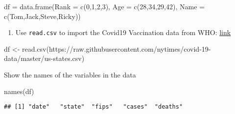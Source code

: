 \documentclass[
]{article}
\newenvironment{Shaded}{\begin{snugshade}}{\end{snugshade}}
\newcommand{\AttributeTok}[1]{\textcolor[rgb]{0.77,0.63,0.00}{#1}}
\newcommand{\FunctionTok}[1]{\textcolor[rgb]{0.00,0.00,0.00}{#1}}
\newcommand{\NormalTok}[1]{#1}
\newcommand{\OtherTok}[1]{\textcolor[rgb]{0.56,0.35,0.01}{#1}}
\newcommand{\StringTok}[1]{\textcolor[rgb]{0.31,0.60,0.02}{#1}}
\providecommand{\tightlist}{%
  \setlength{\itemsep}{0pt}\setlength{\parskip}{0pt}}
\begin{document}
\begin{Shaded}
\begin{Highlighting}[]
\NormalTok{df }\OtherTok{=} \FunctionTok{data.frame}\NormalTok{(}\AttributeTok{Rank =} \FunctionTok{c}\NormalTok{(}\StringTok{\textquotesingle{}0\textquotesingle{}}\NormalTok{,}\StringTok{\textquotesingle{}1\textquotesingle{}}\NormalTok{,}\StringTok{\textquotesingle{}2\textquotesingle{}}\NormalTok{,}\StringTok{\textquotesingle{}3\textquotesingle{}}\NormalTok{), }\AttributeTok{Age =} \FunctionTok{c}\NormalTok{(}\StringTok{\textquotesingle{}28\textquotesingle{}}\NormalTok{,}\StringTok{\textquotesingle{}34\textquotesingle{}}\NormalTok{,}\StringTok{\textquotesingle{}29\textquotesingle{}}\NormalTok{,}\StringTok{\textquotesingle{}42\textquotesingle{}}\NormalTok{), }\AttributeTok{Name =} \FunctionTok{c}\NormalTok{(}\StringTok{\textquotesingle{}Tom\textquotesingle{}}\NormalTok{,}\StringTok{\textquotesingle{}Jack\textquotesingle{}}\NormalTok{,}\StringTok{\textquotesingle{}Steve\textquotesingle{}}\NormalTok{,}\StringTok{\textquotesingle{}Ricky\textquotesingle{}}\NormalTok{))}
\end{Highlighting}
\end{Shaded}

\begin{enumerate}
\def\labelenumi{\arabic{enumi}.}
\setcounter{enumi}{1}
\tightlist
\item
  Use \texttt{read.csv} to import the Covid19 Vaccination data from WHO:
  \href{https://raw.githubusercontent.com/nytimes/covid-19-data/master/us-states.csv}{link}
\end{enumerate}

\begin{Shaded}
\begin{Highlighting}[]
\NormalTok{df }\OtherTok{\textless{}{-}} \FunctionTok{read.csv}\NormalTok{(}\StringTok{\textquotesingle{}https://raw.githubusercontent.com/nytimes/covid{-}19{-}data/master/us{-}states.csv\textquotesingle{}}\NormalTok{)}
\end{Highlighting}
\end{Shaded}

Show the names of the variables in the data

\begin{Shaded}
\begin{Highlighting}[]
\FunctionTok{names}\NormalTok{(df)}
\end{Highlighting}
\end{Shaded}

\begin{verbatim}
## [1] "date"   "state"  "fips"   "cases"  "deaths"
\end{verbatim}
\end{document}
